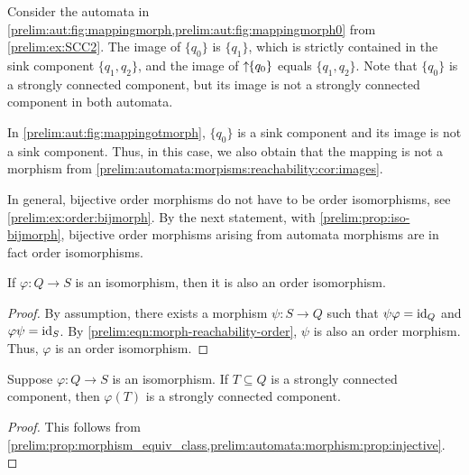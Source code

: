 \begin{remark}
	Consider the automata in \cref{prelim:aut:fig:mappingmorph,prelim:aut:fig:mappingmorph0} 
	from \cref{prelim:ex:SCC2}. 
	The image of $\{q_0\}$ is $\{q_1\}$, which is strictly
	contained in the sink component $\{q_1, q_2\}$,
	and the image of $\mbox{\ensuremath{\displaystyle \uparrow \!\!\{q_0\}}}$ equals $\{q_1, q_2\}$.
	Note that $\{q_0\}$ is a strongly connected component,
	but its image is not a strongly connected component in both automata.
	
	In \cref{prelim:aut:fig:mappingotmorph}, $\{q_0\}$
	is a sink component and its image is not a sink component.
	Thus, in this case, we also obtain that the mapping
	is not a morphism from \cref{prelim:automata:morpisms:reachability:cor:images}.
\end{remark}

In general, bijective order morphisms
do not have to be order isomorphisms, see \cref{prelim:ex:order:bijmorph}.
By the next statement, with \cref{prelim:prop:iso-bijmorph}, bijective order 
morphisms arising from automata morphisms are in fact order isomorphisms.

\begin{proposition} \label{prelim:automata:morphism:prop:injective}
	If $\varphi \colon Q \to S$ is an isomorphism,
	then it is also an order isomorphism.
\end{proposition}
\begin{proof}
	By assumption, there exists a morphism $\psi \colon S \to Q$
	such that $\psi \varphi = \operatorname{id}_Q$
	and $\varphi \psi = \operatorname{id}_S$.
	By \cref{prelim:eqn:morph-reachability-order}, $\psi$
	is also an order morphism.
	Thus, $\varphi$ is an order isomorphism.	
\end{proof}

\begin{corollary} \label{prelim:automata:morphism:prop:injective:SCC-to-SCC}
	Suppose $\varphi \colon Q \to S$ is an isomorphism.
	If $T \subseteq Q$ is a strongly connected component,
	then $\varphi(T)$ is a strongly connected component. 
\end{corollary}
\begin{proof}
	This follows from \cref{prelim:prop:morphism_equiv_class,prelim:automata:morphism:prop:injective}.
\end{proof}


